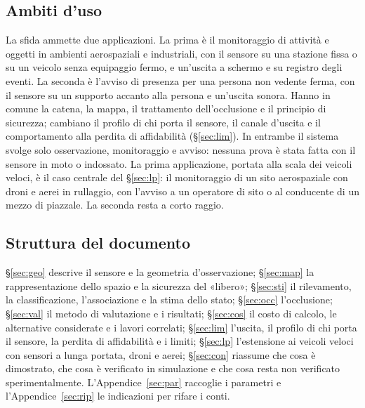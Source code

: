 \subsection{Ambiti d'uso}\label{sec:intro-ambiti}

La sfida ammette due applicazioni. La prima è il monitoraggio di attività e oggetti in ambienti aerospaziali e industriali, con il sensore su una stazione fissa o su un veicolo senza equipaggio fermo, e un'uscita a schermo e su registro degli eventi. La seconda è l'avviso di presenza per una persona non vedente ferma, con il sensore su un supporto accanto alla persona e un'uscita sonora. Hanno in comune la catena, la mappa, il trattamento dell'occlusione e il principio di sicurezza; cambiano il profilo di chi porta il sensore, il canale d'uscita e il comportamento alla perdita di affidabilità (\S\ref{sec:lim}). In entrambe il sistema svolge solo osservazione, monitoraggio e avviso: nessuna prova è stata fatta con il sensore in moto o indossato. La prima applicazione, portata alla scala dei veicoli veloci, è il caso centrale del \S\ref{sec:lp}: il monitoraggio di un sito aerospaziale con droni e aerei in rullaggio, con l'avviso a un operatore di sito o al conducente di un mezzo di piazzale. La seconda resta a corto raggio.

\subsection{Struttura del documento}\label{sec:intro-struttura}

\S\ref{sec:geo} descrive il sensore e la geometria d'osservazione; \S\ref{sec:map} la rappresentazione dello spazio e la sicurezza del «libero»; \S\ref{sec:sti} il rilevamento, la classificazione, l'associazione e la stima dello stato; \S\ref{sec:occ} l'occlusione; \S\ref{sec:val} il metodo di valutazione e i risultati; \S\ref{sec:cos} il costo di calcolo, le alternative considerate e i lavori correlati; \S\ref{sec:lim} l'uscita, il profilo di chi porta il sensore, la perdita di affidabilità e i limiti; \S\ref{sec:lp} l'estensione ai veicoli veloci con sensori a lunga portata, droni e aerei; \S\ref{sec:con} riassume che cosa è dimostrato, che cosa è verificato in simulazione e che cosa resta non verificato sperimentalmente. L'Appendice~\ref{sec:par} raccoglie i parametri e l'Appendice~\ref{sec:rip} le indicazioni per rifare i conti.
